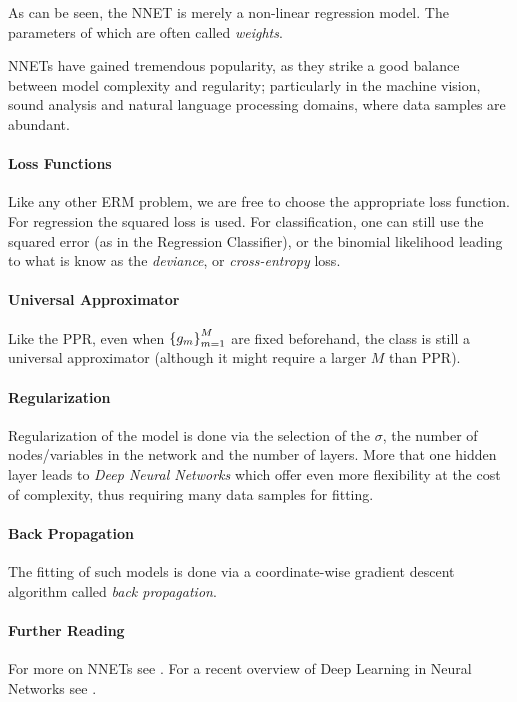 As can be seen, the NNET is merely a non-linear regression model.
The parameters of which are often called \emph{weights}.

NNETs have gained tremendous popularity, as they strike a good balance between model complexity and regularity; particularly in the machine vision, sound analysis and natural language processing domains, where data samples are abundant.

\paragraph{Loss Functions}
Like any other ERM problem, we are free to choose the appropriate loss function.
For regression the squared loss is used. For classification, one can still use the squared error (as in the Regression Classifier), or the binomial likelihood leading to what is know as the \emph{deviance}, or \emph{cross-entropy} loss.

\paragraph{Universal Approximator}
Like the PPR, even when $\left\{ g_m \right\}_{m=1}^M$ are fixed beforehand, the class is still a universal approximator (although it might require a larger $M$ than PPR).

\paragraph{Regularization}
Regularization of the model is done via the selection of the $\sigma$, the number of nodes/variables in the network and the number of layers. More that one hidden layer leads to \emph{Deep Neural Networks} which offer even more flexibility at the cost of complexity, thus requiring many data samples for fitting.

\paragraph{Back Propagation}
The fitting of such models is done via a coordinate-wise gradient descent algorithm called \emph{back propagation}.

\paragraph{Further Reading}
For more on NNETs see \citep[Chapter 11]{hastie_elements_2003}.
For a recent overview of Deep Learning in Neural Networks see \cite{schmidhuber_deep_2015}.




